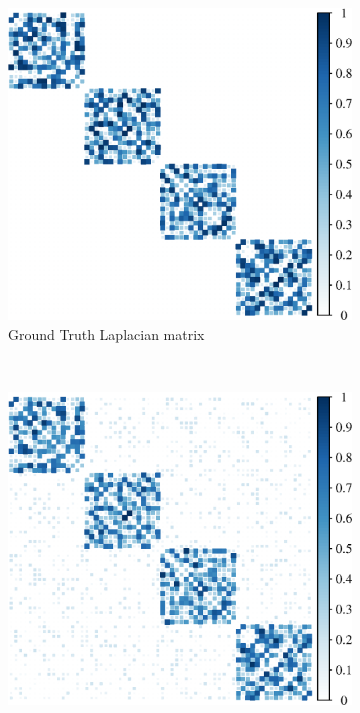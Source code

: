 \documentclass{article}
\begin{document}
\begin{figure}[!htb]
    \centering
    \begin{subfigure}[b]{0.3\textwidth}
        \includegraphics[width=\textwidth]{true_mat.eps}
        \caption{Ground Truth Laplacian matrix}
    \end{subfigure}
    ~ %
    \begin{subfigure}[b]{0.3\textwidth}
        \includegraphics[width=\textwidth]{noisy_mat.eps}

\end{subfigure}
\end{figure}
\end{document}
